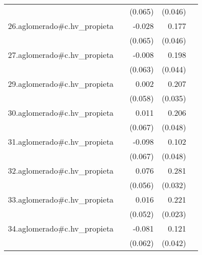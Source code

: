 {\begin{longtable}{l*{4}{D{.}{.}{-1}}}
            &                     &     (0.065)         &     (0.046)         &                     \\
\addlinespace
26.aglomerado#c.hv\_propieta&                     &      -0.028         &       0.177\sym{***}&                     \\
            &                     &     (0.065)         &     (0.046)         &                     \\
\addlinespace
27.aglomerado#c.hv\_propieta&                     &      -0.008         &       0.198\sym{***}&                     \\
            &                     &     (0.063)         &     (0.044)         &                     \\
\addlinespace
29.aglomerado#c.hv\_propieta&                     &       0.002         &       0.207\sym{***}&                     \\
            &                     &     (0.058)         &     (0.035)         &                     \\
\addlinespace
30.aglomerado#c.hv\_propieta&                     &       0.011         &       0.206\sym{***}&                     \\
            &                     &     (0.067)         &     (0.048)         &                     \\
\addlinespace
31.aglomerado#c.hv\_propieta&                     &      -0.098         &       0.102\sym{*}  &                     \\
            &                     &     (0.067)         &     (0.048)         &                     \\
\addlinespace
32.aglomerado#c.hv\_propieta&                     &       0.076         &       0.281\sym{***}&                     \\
            &                     &     (0.056)         &     (0.032)         &                     \\
\addlinespace
33.aglomerado#c.hv\_propieta&                     &       0.016         &       0.221\sym{***}&                     \\
            &                     &     (0.052)         &     (0.023)         &                     \\
\addlinespace
34.aglomerado#c.hv\_propieta&                     &      -0.081         &       0.121\sym{**} &                     \\
            &                     &     (0.062)         &     (0.042)         &                     \\

\end{longtable}}
